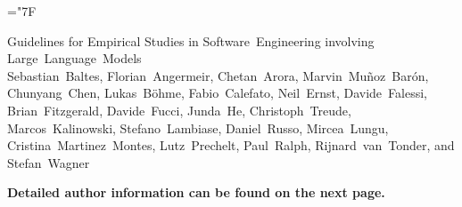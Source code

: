 \documentclass[
	pdftex,
	final,
	12pt,
	a4paper,
	parskip=false, %
	twoside, %
	footheight=0mm, %
  	foot include=false,
	toc=bibliography, %
	toc=listof, %
]{scrbook} %
\newcommand{\papertitle}{Guidelines for Empirical Studies in Software~Engineering involving Large~Language~Models}
\newcommand{\authornames}{Sebastian~Baltes, Florian~Angermeir, Chetan~Arora, Marvin~Muñoz~Barón, Chunyang~Chen, Lukas~Böhme, Fabio~Calefato, Neil~Ernst, Davide~Falessi, Brian~Fitzgerald, Davide~Fucci, Junda~He, Christoph~Treude, Marcos~Kalinowski, Stefano~Lambiase, Daniel~Russo, Mircea~Lungu, Cristina~Martinez~Montes, Lutz~Prechelt, Paul~Ralph, Rijnard~van~Tonder, and Stefan~Wagner}
\begin{document}
\hyphenchar\font=\string"7F %

\frontmatter %

\begin{titlepage}

        \vfill
    
	\begin{center}
		{\LARGE\textsf{\papertitle}}\\
		\vspace{1cm}
		{\large \authornames}\\
	\end{center}

	\vspace{4cm}
		
	\begin{center}
		{\large\textbf{Detailed author information can be found on the next page.}}
	\end{center}

\end{titlepage}
\end{document}
